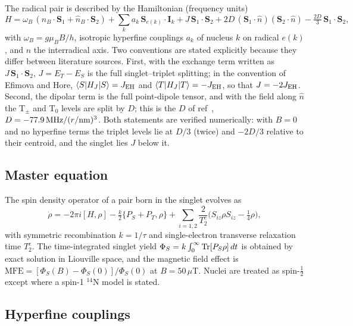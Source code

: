 \documentclass[journal=jpcbfk,manuscript=article,layout=traditional]{achemso}
\begin{document}
The radical pair is described by the Hamiltonian (frequency units)
\begin{equation}
H = \omega_B\,(\hat n_B\!\cdot\!\mathbf S_1 + \hat n_B\!\cdot\!\mathbf S_2)
  + \sum_k a_k\,\mathbf S_{e(k)}\!\cdot\!\mathbf I_k
  + J\,\mathbf S_1\!\cdot\!\mathbf S_2
  + 2D\,(\mathbf S_1\!\cdot\!\hat n)(\mathbf S_2\!\cdot\!\hat n)
  - \tfrac{2D}{3}\,\mathbf S_1\!\cdot\!\mathbf S_2 ,
\label{eq:H}
\end{equation}
with $\omega_B = g\mu_B B/h$, isotropic hyperfine couplings $a_k$ of nucleus $k$
on radical $e(k)$, and $\hat n$ the interradical axis. Two conventions are stated
explicitly because they differ between literature sources. First, with the
exchange term written as $J\,\mathbf S_1\!\cdot\!\mathbf S_2$, $J = E_T - E_S$ is
the full singlet--triplet splitting; in the convention of Efimova and
Hore,\cite{Efimova2008} $\langle S|H_J|S\rangle = J_{\rm EH}$ and
$\langle T|H_J|T\rangle = -J_{\rm EH}$, so that $J = -2J_{\rm EH}$. Second, the
dipolar term is the full point-dipole tensor, and with the field along $\hat n$
the T$_\pm$ and T$_0$ levels are split by $D$; this is the $D$ of
ref~, $D = -77.9\,{\rm MHz}/(r/{\rm nm})^3$. Both statements
are verified numerically: with $B = 0$ and no hyperfine terms the triplet levels
lie at $D/3$ (twice) and $-2D/3$ relative to their centroid, and the singlet lies
$J$ below it.

\subsection{Master equation}

The spin density operator of a pair born in the singlet evolves as
\begin{equation}
\dot\rho = -2\pi i[H,\rho] - \tfrac{k}{2}\{P_S+P_T,\rho\}
 + \sum_{i=1,2}\frac{2}{T_2^{e}}\Big(S_{iz}\rho S_{iz}-\tfrac14\rho\Big),
\end{equation}
with symmetric recombination $k = 1/\tau$ and single-electron transverse
relaxation time $T_2^e$. The time-integrated singlet yield
$\Phi_S = k\int_0^\infty{\rm Tr}[P_S\rho]\,dt$ is obtained by exact solution in
Liouville space, and the magnetic field effect is
$\mathrm{MFE} = [\Phi_S(B)-\Phi_S(0)]/\Phi_S(0)$ at $B = 50\,\mu$T. Nuclei are
treated as spin-$\tfrac12$ except where a spin-1 $^{14}$N model is stated.

\subsection{Hyperfine couplings}
\end{document}
